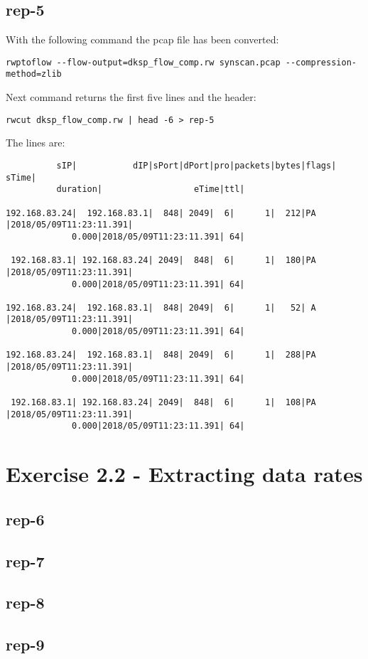 \subsection*{rep-5}
With the following command the pcap file has been converted:
\begin{verbatim}
rwptoflow --flow-output=dksp_flow_comp.rw synscan.pcap --compression-method=zlib
\end{verbatim}
Next command returns the first five lines and the header:
\begin{verbatim}
rwcut dksp_flow_comp.rw | head -6 > rep-5
\end{verbatim}
The lines are:
\begin{verbatim}
          sIP|           dIP|sPort|dPort|pro|packets|bytes|flags|                  sTime|
          duration|                  eTime|ttl|
          
192.168.83.24|  192.168.83.1|  848| 2049|  6|      1|  212|PA   |2018/05/09T11:23:11.391|
             0.000|2018/05/09T11:23:11.391| 64|
             
 192.168.83.1| 192.168.83.24| 2049|  848|  6|      1|  180|PA   |2018/05/09T11:23:11.391|
             0.000|2018/05/09T11:23:11.391| 64|
             
192.168.83.24|  192.168.83.1|  848| 2049|  6|      1|   52| A   |2018/05/09T11:23:11.391|
             0.000|2018/05/09T11:23:11.391| 64|
             
192.168.83.24|  192.168.83.1|  848| 2049|  6|      1|  288|PA   |2018/05/09T11:23:11.391|
             0.000|2018/05/09T11:23:11.391| 64|
             
 192.168.83.1| 192.168.83.24| 2049|  848|  6|      1|  108|PA   |2018/05/09T11:23:11.391|
             0.000|2018/05/09T11:23:11.391| 64|
\end{verbatim}

\section*{Exercise 2.2 - Extracting data rates}
\subsection*{rep-6}
\subsection*{rep-7}
\subsection*{rep-8}
\subsection*{rep-9}